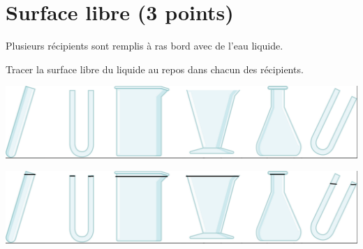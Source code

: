 \section{Surface libre (3 points)}\label{ex:surface}

Plusieurs récipients sont remplis à ras bord avec de l'eau liquide.


\begin{questions}
	
			
		\question[3] Tracer la surface libre du liquide au repos dans chacun des récipients.
		
		\begin{center}
			\includegraphics[scale=0.4]{img/surface}
		\end{center}	
	
		\begin{solution}
			\begin{center}
				\includegraphics[scale=0.35]{img/surface_v2}
			\end{center}	

		\end{solution}
\end{questions}
